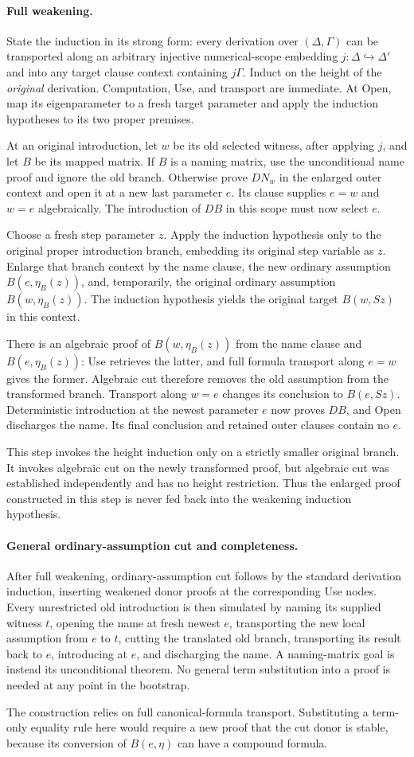 \paragraph{Full weakening.}
State the induction in its strong form: every derivation over $(\Delta,\Gamma)$
can be transported along an arbitrary injective numerical-scope embedding
$j:\Delta\hookrightarrow\Delta'$ and into any target clause context
containing $j\Gamma$. Induct on the height of the \emph{original} derivation.
Computation, Use, and transport are immediate. At Open, map its eigenparameter
to a fresh target parameter and apply the induction hypotheses to its two
proper premises.

At an original introduction, let $w$ be its old selected witness, after
applying $j$, and let $B$ be its mapped matrix. If $B$ is a naming matrix,
use the unconditional name proof and ignore the old branch. Otherwise prove
$D N_w$ in the enlarged outer context and open it at a new last parameter
$e$. Its clause supplies $e=w$ and $w=e$ algebraically. The introduction
of $D B$ in this scope must now select $e$.

Choose a fresh step parameter $z$. Apply the induction hypothesis only to
the original proper introduction branch, embedding its original step variable
as $z$. Enlarge that branch context by the name clause, the new ordinary
assumption $B(e,\eta_B(z))$, and, temporarily, the original ordinary
assumption $B(w,\eta_B(z))$. The induction hypothesis yields the original
target $B(w,Sz)$ in this context.

There is an algebraic proof of $B(w,\eta_B(z))$ from the name clause and
$B(e,\eta_B(z))$: Use retrieves the latter, and full formula transport along
$e=w$ gives the former. Algebraic cut therefore removes the old assumption
from the transformed branch. Transport along $w=e$ changes its conclusion
to $B(e,Sz)$. Deterministic introduction at the newest parameter $e$ now
proves $D B$, and Open discharges the name. Its final conclusion and retained
outer clauses contain no $e$.

This step invokes the height induction only on a strictly smaller original
branch. It invokes algebraic cut on the newly transformed proof, but algebraic
cut was established independently and has no height restriction. Thus the
enlarged proof constructed in this step is never fed back into the weakening
induction hypothesis.

\paragraph{General ordinary-assumption cut and completeness.}
After full weakening, ordinary-assumption cut follows by the standard
derivation induction, inserting weakened donor proofs at the corresponding
Use nodes. Every unrestricted old introduction is then simulated by naming
its supplied witness $t$, opening the name at fresh newest $e$, transporting
the new local assumption from $e$ to $t$, cutting the translated old branch,
transporting its result back to $e$, introducing at $e$, and discharging the
name. A naming-matrix goal is instead its unconditional theorem. No general
term substitution into a proof is needed at any point in the bootstrap.

The construction relies on full canonical-formula transport. Substituting a
term-only equality rule here would require a new proof that the cut donor is
stable, because its conversion of $B(e,\eta)$ can have a compound formula.
